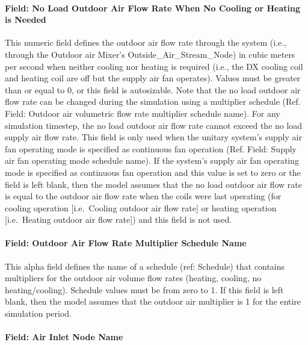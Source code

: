 \paragraph{Field: No Load Outdoor Air Flow Rate When No Cooling or Heating is Needed}\label{field-no-load-outdoor-air-flow-rate-when-no-cooling-or-heating-is-needed}

This numeric field defines the outdoor air flow rate through the system (i.e., through the Outdoor air Mixer's Outside\_Air\_Stream\_Node) in cubic meters per second when neither cooling nor heating is required (i.e., the DX cooling coil and heating coil are off but the supply air fan operates). Values must be greater than or equal to 0, or this field is autosizable. Note that the no load outdoor air flow rate can be changed during the simulation using a multiplier schedule (Ref. Field: Outdoor air volumetric flow rate multiplier schedule name). For any simulation timestep, the no load outdoor air flow rate cannot exceed the no load supply air flow rate. This field is only used when the unitary system's supply air fan operating mode is specified as continuous fan operation (Ref. Field: Supply air fan operating mode schedule name). If the system's supply air fan operating mode is specified as continuous fan operation and this value is set to zero or the field is left blank, then the model assumes that the no load outdoor air flow rate is equal to the outdoor air flow rate when the coils were last operating (for cooling operation {[}i.e.~Cooling outdoor air flow rate{]} or heating operation {[}i.e.~Heating outdoor air flow rate{]}) and this field is not used.

\paragraph{Field: Outdoor Air Flow Rate Multiplier Schedule Name}\label{field-outdoor-air-flow-rate-multiplier-schedule-name}

This alpha field defines the name of a schedule (ref: Schedule) that contains multipliers for the outdoor air volume flow rates (heating, cooling, no heating/cooling). Schedule values must be from zero to 1. If this field is left blank, then the model assumes that the outdoor air multiplier is 1 for the entire simulation period.

\paragraph{Field: Air Inlet Node Name}\label{field-air-inlet-node-name-3-002}

